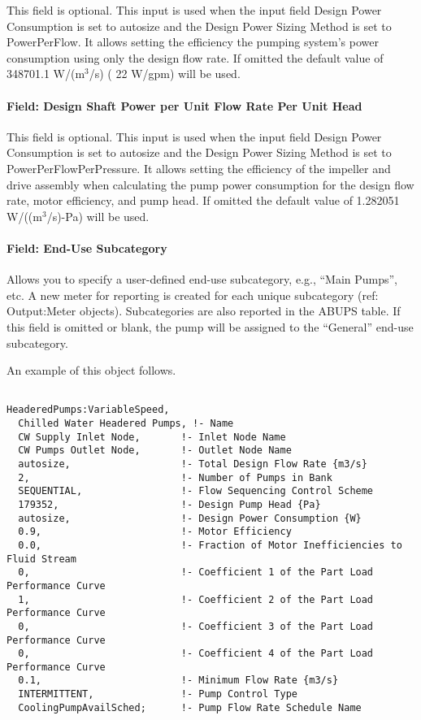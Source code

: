 This field is optional. This input is used when the input field Design Power Consumption is set to autosize and the Design Power Sizing Method is set to PowerPerFlow. It allows setting the efficiency the pumping system's power consumption using only the design flow rate. If omitted the default value of 348701.1 W/(m\(^{3}\)/s) ( 22 W/gpm) will be used.

\paragraph{Field: Design Shaft Power per Unit Flow Rate Per Unit Head}\label{field-design-shaft-power-per-unit-flow-rate-per-unit-head-4}

This field is optional. This input is used when the input field Design Power Consumption is set to autosize and the Design Power Sizing Method is set to PowerPerFlowPerPressure. It allows setting the efficiency of the impeller and drive assembly when calculating the pump power consumption for the design flow rate, motor efficiency, and pump head. If omitted the default value of 1.282051 W/((m\(^{3}\)/s)-Pa) will be used.

\paragraph{Field: End-Use Subcategory}\label{field-end-use-subcategory-5-000}

Allows you to specify a user-defined end-use subcategory, e.g., ``Main Pumps'', etc. A new meter for reporting is created for each unique subcategory (ref: Output:Meter objects). Subcategories are also reported in the ABUPS table. If this field is omitted or blank, the pump will be assigned to the ``General'' end-use subcategory.

An example of this object follows.

\begin{lstlisting}

HeaderedPumps:VariableSpeed,
  Chilled Water Headered Pumps, !- Name
  CW Supply Inlet Node,       !- Inlet Node Name
  CW Pumps Outlet Node,       !- Outlet Node Name
  autosize,                   !- Total Design Flow Rate {m3/s}
  2,                          !- Number of Pumps in Bank
  SEQUENTIAL,                 !- Flow Sequencing Control Scheme
  179352,                     !- Design Pump Head {Pa}
  autosize,                   !- Design Power Consumption {W}
  0.9,                        !- Motor Efficiency
  0.0,                        !- Fraction of Motor Inefficiencies to Fluid Stream
  0,                          !- Coefficient 1 of the Part Load Performance Curve
  1,                          !- Coefficient 2 of the Part Load Performance Curve
  0,                          !- Coefficient 3 of the Part Load Performance Curve
  0,                          !- Coefficient 4 of the Part Load Performance Curve
  0.1,                        !- Minimum Flow Rate {m3/s}
  INTERMITTENT,               !- Pump Control Type
  CoolingPumpAvailSched;      !- Pump Flow Rate Schedule Name
\end{lstlisting}

